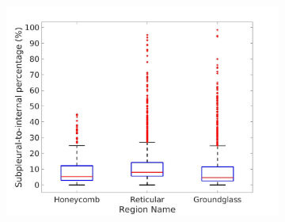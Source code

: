 \begin{figure}[htbp] 
\centering
\begin{subfigure}{.5\linewidth}%
  \includegraphics[width=\linewidth,trim={{.0\wd0} {.0\wd0} {.0\wd0} {.0\wd0}},clip]{QuantitativeAnalysis/Image/LeftLungDiseaseSubpleuralPercent.jpg} %
  \caption{}
  \label{fig:DiseaseSubpleuralPercent-a} 
\end{subfigure} 
\hspace{.3in}
\begin{subfigure}{.5\linewidth}%

\end{subfigure}
\end{figure}
